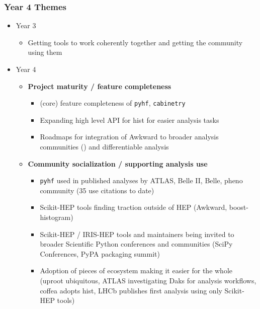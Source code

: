 \begin{frame}
  \frametitle{Year 4 Themes}

  \begin{itemize}\setlength{\itemsep}{0.25 cm}
    \item Year 3 
    \begin{itemize}
      \item Getting tools to work coherently together and getting the community using them
    \end{itemize}
    \item Year 4
    \begin{itemize}
      \item \textbf{Project maturity / feature completeness}
      \begin{itemize}
        \item (core) feature completeness of \texttt{pyhf}, \texttt{cabinetry}
        \item Expanding high level API for hist for easier analysis tasks
        \item Roadmaps for integration of Awkward to broader analysis communities () and differentiable analysis
      \end{itemize}
      \item \textbf{Community socialization / supporting analysis use}
      \begin{itemize}
        \item \texttt{pyhf} used in published analyses by ATLAS, Belle II, Belle, pheno community (35 use citations to date)
        \item Scikit-HEP tools finding traction outside of HEP (Awkward, boost-histogram)
        \item Scikit-HEP / IRIS-HEP tools and maintainers being invited to broader Scientific Python conferences and communities (SciPy Conferences, PyPA packaging summit)
        \item Adoption of pieces of ecosystem making it easier for the whole (uproot ubiquitous, ATLAS investigating Daks for analysis workflows, coffea adopts hist, LHCb publishes first analysis using only Scikit-HEP tools)
      \end{itemize}
    \end{itemize}
  \end{itemize}

\end{frame}

